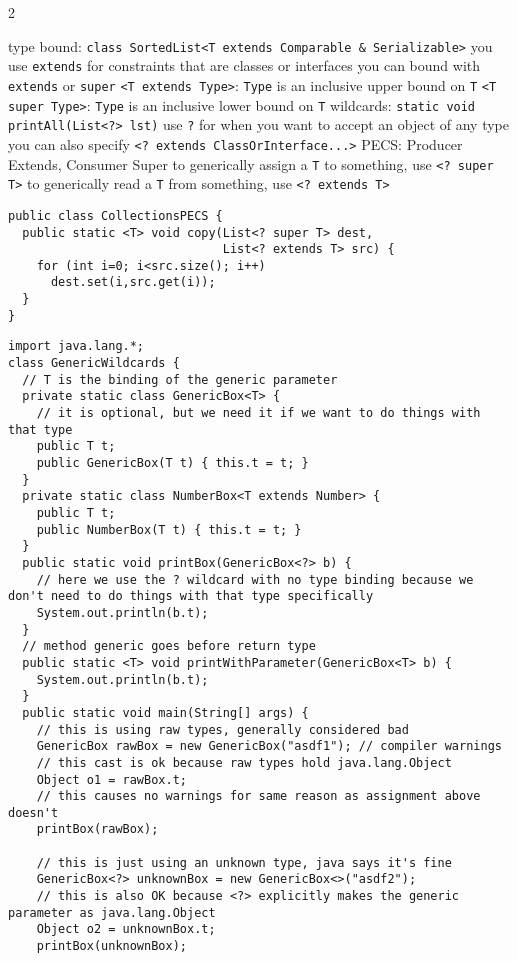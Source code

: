 \documentclass{article}
\def \columncount {2}
\newcommand{\codesize}{8.5}
\newcommand{\java}[1]{{\fontsize{\codesize}{\codesize}\selectfont\texttt{#1}}}
\begin{document}
\begin{multicols*}{\columncount}
\begin{outline}[longenum]
  \1 type bound: \java{class SortedList<T extends Comparable & Serializable>}
    \2 you use \java{extends} for constraints that are classes or interfaces
    \2 you can bound with \java{extends} or \java{super}
    \2 \java{<T extends Type>}: \java{Type} is an inclusive upper bound on \java{T}
    \2 \java{<T super Type>}: \java{Type} is an inclusive lower bound on \java{T}
  \1 wildcards: \java{static void printAll(List<?> lst)} use \java{?} for when you want to accept an object of any type
    \2 you can also specify \java{<? extends ClassOrInterface...>}
  \1 PECS: Producer Extends, Consumer Super
    \2 to generically assign a \java{T} to something, use \java{<? super T>}
    \2 to generically read a \java{T} from something, use \java{<? extends T>}
\0\begin{verbatim}
public class CollectionsPECS { 
  public static <T> void copy(List<? super T> dest, 
                              List<? extends T> src) {
    for (int i=0; i<src.size(); i++) 
      dest.set(i,src.get(i)); 
  } 
}
\end{verbatim}
\0\begin{verbatim}
import java.lang.*;
class GenericWildcards {
  // T is the binding of the generic parameter
  private static class GenericBox<T> {
    // it is optional, but we need it if we want to do things with that type
    public T t;
    public GenericBox(T t) { this.t = t; }
  }
  private static class NumberBox<T extends Number> {
    public T t;
    public NumberBox(T t) { this.t = t; } 
  }
  public static void printBox(GenericBox<?> b) {
    // here we use the ? wildcard with no type binding because we don't need to do things with that type specifically
    System.out.println(b.t);
  }
  // method generic goes before return type
  public static <T> void printWithParameter(GenericBox<T> b) {
    System.out.println(b.t);
  }
  public static void main(String[] args) {
    // this is using raw types, generally considered bad
    GenericBox rawBox = new GenericBox("asdf1"); // compiler warnings
    // this cast is ok because raw types hold java.lang.Object
    Object o1 = rawBox.t;
    // this causes no warnings for same reason as assignment above doesn't
    printBox(rawBox);
    
    // this is just using an unknown type, java says it's fine
    GenericBox<?> unknownBox = new GenericBox<>("asdf2");
    // this is also OK because <?> explicitly makes the generic parameter as java.lang.Object
    Object o2 = unknownBox.t;
    printBox(unknownBox);


\end{verbatim}
\end{outline}
\end{multicols*}
\end{document}
